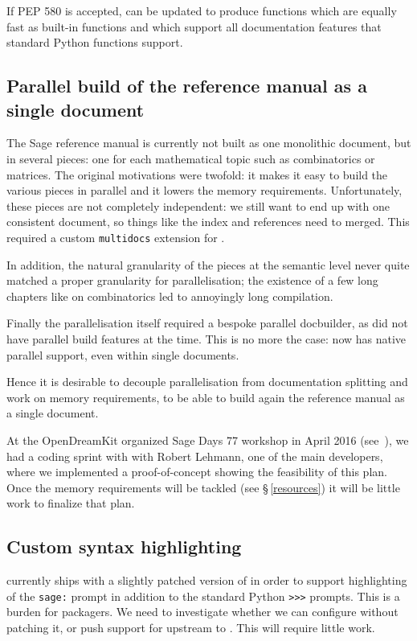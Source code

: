 \documentclass{deliverablereport}
\begin{document}
If PEP 580 is accepted, \Cython can be updated to produce
functions which are equally fast as built-in functions
and which support all documentation
features that standard Python functions support.

\subsection{Parallel build of the reference manual as a single document}\label{pieces}\label{parallel}

The Sage reference manual is currently not built as one monolithic document,
but in several pieces:
one for each mathematical topic such as combinatorics or matrices.
The original motivations were twofold: it makes it easy to build the various pieces
in parallel and it lowers the memory requirements.
Unfortunately, these pieces are not completely independent:
we still want to end up with one consistent document,
so things like the index and references need to merged.
This required a custom \Sage \texttt{multidocs} extension for \Sphinx.

In addition, the natural granularity of the pieces at the semantic
level never quite matched a proper granularity for parallelisation;
the existence of a few long chapters like on combinatorics led to
annoyingly long compilation.

Finally the parallelisation itself required a bespoke parallel
docbuilder, as \Sphinx did not have parallel build features at the
time. This is no more the case: \Sphinx now has native parallel
support, even within single documents.

Hence it is desirable to decouple parallelisation from documentation
splitting and work on memory requirements, to be able to build again
the reference manual as a single document.

At the OpenDreamKit organized Sage Days 77 workshop in April 2016
(see~), we had a coding sprint with with
Robert Lehmann, one of the main \Sphinx developers, where we
implemented a proof-of-concept showing the feasibility of this plan.
Once the memory requirements will be tackled (see \S\,\ref{resources})
it will be little work to finalize that plan.

\subsection{Custom syntax highlighting}

\Sage currently ships with a slightly patched version of \Pygments in
order to support highlighting of the \texttt{sage:} prompt in addition
to the standard Python \texttt{>>>} prompts. This is a burden for
packagers. We need to investigate whether we can configure \Pygments
without patching it, or push support for \Sage upstream to \Pygments.
This will require little work.
\end{document}
